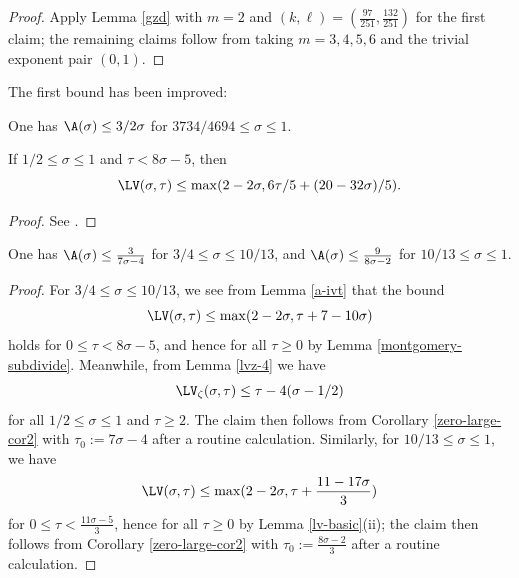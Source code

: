 \begin{proof} Apply Lemma \ref{gzd} with $m=2$ and $(k,\ell) = (\frac{97}{251}, \frac{132}{251})$ for the first claim; the remaining claims follow from taking $m=3, 4, 5, 6$ and the trivial exponent pair $(0, 1)$.
\end{proof}

The first bound has been improved:

\begin{theorem}\label{bourgain-zero-density-2000}\cite{bourgain_dirichlet_2000} One has $\A(\sigma) \leq 3/2\sigma$ for $3734/4694 \leq \sigma \leq 1$.
\end{theorem}
\literature
{}

\begin{lemma}\label{a-ivt}  If $1/2 \leq \sigma \leq 1$ and $\tau < 8\sigma-5$, then
    $$ \LV(\sigma,\tau) \leq \max( 2-2\sigma, 6\tau/5 + (20-32\sigma)/5 ).$$
\end{lemma}

\begin{proof} See \cite[(11.95)]{ivic}.
\end{proof}

\begin{corollary}\label{ivic-near-34}\cite[Theorem 11.5]{ivic}  One has $\A(\sigma) \leq \frac{3}{7\sigma-4}$ for $3/4 \leq \sigma \leq 10/13$, and $\A(\sigma) \leq \frac{9}{8\sigma-2}$ for $10/13 \leq \sigma \leq 1$.
\end{corollary}

\begin{proof}  For $3/4 \leq \sigma \leq 10/13$, we see from Lemma \ref{a-ivt} that the bound
$$ \LV(\sigma,\tau) \leq \max(2-2\sigma, \tau + 7 - 10\sigma )$$
holds for $0 \leq \tau < 8\sigma-5$, and hence for all $\tau \geq 0$ by Lemma \ref{montgomery-subdivide}.  Meanwhile, from Lemma \ref{lvz-4} we have
$$\LV_\zeta(\sigma,\tau) \leq \tau - 4 (\sigma-1/2)$$
for all $1/2 \leq \sigma \leq 1$ and $\tau \geq 2$. The claim then follows from Corollary
\ref{zero-large-cor2} with $\tau_0 := 7\sigma-4$ after a routine calculation.  Similarly, for $10/13 \leq \sigma \leq 1$, we have
$$ \LV(\sigma,\tau) \leq \max(2-2\sigma, \tau + \frac{11 - 17 \sigma}{3} )$$
for $0 \leq \tau < \frac{11\sigma-5}{3}$, hence for all $\tau \geq 0$ by Lemma \ref{lv-basic}(ii); the claim then follows from Corollary
\ref{zero-large-cor2} with $\tau_0 := \frac{8\sigma-2}{3}$ after a routine calculation.
\end{proof}


